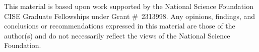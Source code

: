 \documentclass{article}
\begin{document}
This material is based upon work supported by the National Science Foundation CISE
Graduate Fellowships under Grant \#~2313998. Any opinions, findings, and
conclusions or recommendations expressed in this material are those of the
author(s) and do not necessarily reflect the views of the National Science
Foundation.

\FloatBarrier

\newpage 




\newpage 
\newpage

\appendix

\end{document}

